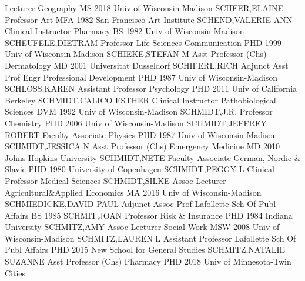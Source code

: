 \documentclass[
]{article}
\begin{document}
\textbar Lecturer \textbar Geography \textbar{}  \textbar MS
2018 Univ of Wisconsin-Madison \textbar SCHEER,ELAINE \textbar Professor
\textbar Art \textbar{}  \textbar MFA 1982 San Francisco Art
Institute \textbar SCHEND,VALERIE ANN \textbar Clinical Instructor
\textbar Pharmacy \textbar{}  \textbar BS 1982 Univ of
Wisconsin-Madison \textbar SCHEUFELE,DIETRAM \textbar Professor
\textbar Life Sciences Communication \textbar{} 
\textbar PHD 1999 Univ of Wisconsin-Madison \textbar SCHIEKE,STEFAN M
\textbar Asst Professor (Chs) \textbar Dermatology \textbar{}
 \textbar MD 2001 Universitat Dusseldorf
\textbar SCHIFERL,RICH \textbar Adjunct Asst Prof \textbar Engr
Professional Development \textbar{}  \textbar PHD 1987 Univ
of Wisconsin-Madison \textbar SCHLOSS,KAREN \textbar Assistant Professor
\textbar Psychology \textbar{}  \textbar PHD 2011 Univ of
California Berkeley \textbar SCHMIDT,CALICO ESTHER \textbar Clinical
Instructor \textbar Pathobiological Sciences \textbar{} 
\textbar DVM 1992 Univ of Wisconsin-Madison \textbar SCHMIDT,J.R.
\textbar Professor \textbar Chemistry \textbar{} 
\textbar PHD 2006 Univ of Wisconsin-Madison \textbar SCHMIDT,JEFFREY
ROBERT \textbar Faculty Associate \textbar Physics \textbar{}
 \textbar PHD 1987 Univ of Wisconsin-Madison
\textbar SCHMIDT,JESSICA N \textbar Asst Professor (Chs)
\textbar Emergency Medicine \textbar{}  \textbar MD 2010
Johns Hopkins University \textbar SCHMIDT,NETE \textbar Faculty
Associate \textbar German, Nordic \& Slavic \textbar{} 
\textbar PHD 1980 University of Copenhagen \textbar SCHMIDT,PEGGY L
\textbar Clinical Professor \textbar Medical Sciences \textbar{}
 \textbar SCHMIDT,SILKE \textbar Assoc Lecturer
\textbar Agricultural\&Applied Economics \textbar MA 2016 Univ of
Wisconsin-Madison \textbar{}  \textbar SCHMIEDICKE,DAVID
PAUL \textbar Adjunct Assoc Prof \textbar Lafollette Sch Of Publ Affairs
\textbar BS 1985 \textbar{}  \textbar SCHMIT,JOAN
\textbar Professor \textbar Risk \& Insurance \textbar PHD 1984 Indiana
University \textbar{}  \textbar SCHMITZ,AMY \textbar Assoc
Lecturer \textbar Social Work \textbar MSW 2008 Univ of
Wisconsin-Madison \textbar{}  \textbar SCHMITZ,LAUREN L
\textbar Assistant Professor \textbar Lafollette Sch Of Publ Affairs
\textbar PHD 2015 New School for General Studies \textbar{} 
\textbar SCHMITZ,NATALIE SUZANNE \textbar Asst Professor (Chs)
\textbar Pharmacy \textbar PHD 2018 Univ of Minnesota-Twin Cities
\end{document}
